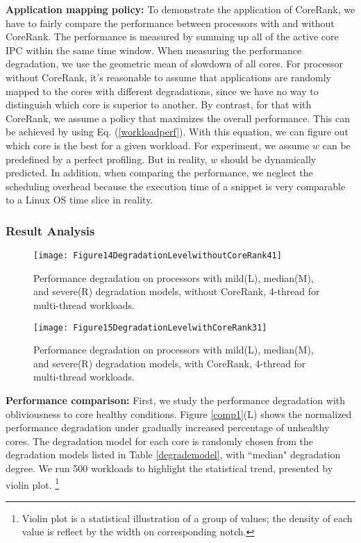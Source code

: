 \textbf{Application mapping policy:} To demonstrate the application of CoreRank, we have to fairly compare the performance between processors with and without CoreRank.  The performance is measured by summing up all of the active core IPC within the same time window. When measuring the performance degradation, we use the geometric mean of slowdown of all cores.  For processor without CoreRank, it's reasonable to assume that applications are randomly mapped to the cores with different degradations, since we have no way to distinguish which core is superior to another. By contrast, for that with CoreRank, we assume a policy that maximizes the overall performance. This can be achieved by using Eq. (\ref{workloadperf}). With this equation, we can figure out  which core is the best for a given workload. For experiment, we assume $w$ can be predefined by a perfect profiling. But in reality, $w$ should be dynamically predicted. In addition, when comparing the performance, we neglect the scheduling overhead because the execution time of a snippet is very comparable to a Linux OS time slice in reality.

\subsubsection{Result Analysis}
\begin{figure*}[t]
 \centering
  \texttt{[image: Figure14DegradationLevelwithoutCoreRank41]}\\
\caption{Performance degradation on processors with mild(L), median(M), and severe(R) degradation models,  without CoreRank,  4-thread for multi-thread workloads.}
\label{comp2}
\end{figure*}

\begin{figure*}[t]
 \centering
  \texttt{[image: Figure15DegradationLevelwithCoreRank31]}\\
\caption{Performance degradation on processors with mild(L), median(M), and severe(R) degradation models,  with CoreRank,  4-thread for multi-thread workloads.}
\label{comp3}
\end{figure*}

\textbf{Performance comparison:} First, we study the performance degradation with obliviousness to core healthy conditions.  Figure \ref{comp1}(L) shows the normalized performance degradation under gradually increased percentage of unhealthy cores.   The degradation model for each core is randomly chosen from the degradation models listed in Table \ref{degrademodel}, with ``median" degradation degree.  We run 500 workloads to highlight the statistical trend, presented by violin plot. \footnote{Violin plot is a statistical illustration of a group of values; the density of each value is reflect by the width on corresponding notch.}  

